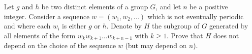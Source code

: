 Let \(g\) and \(h\) be two distinct elements of a group \(G\), and let \(n\) be a positive integer. Consider a sequence \(w = (w_1, w_2, \ldots)\) which is not eventually periodic and where each \(w_i\) is either \(g\) or \(h\). Denote by \(H\) the subgroup of \(G\) generated by all elements of the form \(w_k w_{k+1} \ldots w_{k+n-1}\) with \(k \ge 1\). Prove that \(H\) does not depend on the choice of the sequence \(w\) (but may depend on \(n\)).
